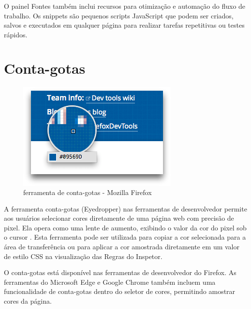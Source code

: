 O painel Fontes também inclui recursos para otimização e automação do fluxo de trabalho. Os snippets são pequenos scripts JavaScript que podem ser criados, salvos e executados em qualquer página para realizar tarefas repetitivas ou testes rápidos. 

\section{Conta-gotas}
\begin{figure}[h!]
    \centering
    \includegraphics[width=0.7\linewidth]{assets/tools/firefox-eyedropper.png}
    \caption{ferramenta de conta-gotas - Mozilla Firefox }
    \label{fig:enter-label}
\end{figure}
A ferramenta conta-gotas (Eyedropper) nas ferramentas de desenvolvedor permite aos usuários selecionar cores diretamente de uma página web com precisão de pixel. Ela opera como uma lente de aumento, exibindo o valor da cor do pixel sob o cursor \cite{firefox}. Esta ferramenta pode ser utilizada para copiar a cor selecionada para a área de transferência ou para aplicar a cor amostrada diretamente em um valor de estilo CSS na visualização das Regras do Inspetor\cite{firefox}.

O conta-gotas está disponível nas ferramentas de desenvolvedor do Firefox. As ferramentas do Microsoft Edge e Google Chrome também incluem uma funcionalidade de conta-gotas dentro do seletor de cores, permitindo amostrar cores da página.
\newpage
